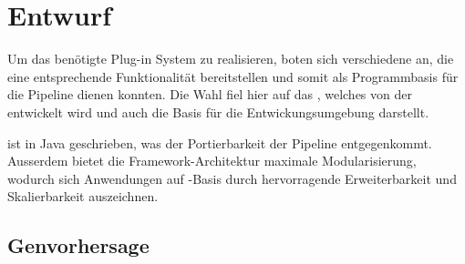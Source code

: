 \chapter{Entwurf}
Um das benötigte Plug-in System zu realisieren, boten sich verschiedene
 an, die eine entsprechende Funktionalität
bereitstellen und somit als Programmbasis für die  Pipeline dienen konnten.
Die Wahl fiel hier auf das  , welches von
der  entwickelt wird und auch die Basis für die
Entwickungsumgebung  darstellt.

 ist in Java geschrieben, was der Portierbarkeit der
Pipeline entgegenkommt. Ausserdem bietet die Framework-Architektur maximale
Modularisierung, wodurch sich Anwendungen auf -Basis durch
hervorragende Erweiterbarkeit und Skalierbarkeit auszeichnen.




\section{Genvorhersage}
\todo{\dots}






 
